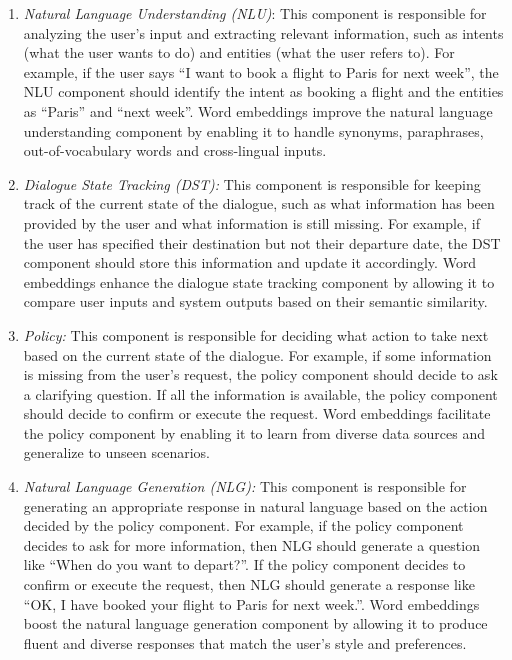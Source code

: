 \documentclass[11pt, a4paper]{amsart}
\begin{document}
\begin{enumerate}
	\item \emph{Natural Language Understanding (NLU)}:
	This component is responsible for analyzing the user’s input and extracting relevant information, such as intents (what the user wants to do) and entities (what the user refers to).
	For example, if the user says ``I want to book a flight to Paris for next week'', the NLU component should identify the intent as booking a flight and the entities as ``Paris'' and ``next week''.
	Word embeddings improve the natural language understanding component by enabling it to handle synonyms, paraphrases, out-of-vocabulary words and cross-lingual inputs.
	\item \emph{Dialogue State Tracking (DST):}
	This component is responsible for keeping track of the current state of the dialogue, such as what information has been provided by the user and what information is still missing.
	For example, if the user has specified their destination but not their departure date, the DST component should store this information and update it accordingly.
	Word embeddings enhance the dialogue state tracking component by allowing it to compare user inputs and system outputs based on their semantic similarity.
	\item \emph{Policy:}
	This component is responsible for deciding what action to take next based on the current state of the dialogue.
	For example, if some information is missing from the user’s request, the policy component should decide to ask a clarifying question.
	If all the information is available, the policy component should decide to confirm or execute the request.
	Word embeddings facilitate the policy component by enabling it to learn from diverse data sources and generalize to unseen scenarios.
	\item \emph{Natural Language Generation (NLG):}
	This component is responsible for generating an appropriate response in natural language based on the action decided by the policy component.
	For example, if the policy component decides to ask for more information, then NLG should generate a question like “When do you want to depart?”.
	If the policy component decides to confirm or execute the request, then NLG should generate a response like “OK, I have booked your flight to Paris for next week.”.
	Word embeddings boost the natural language generation component by allowing it to produce fluent and diverse responses that match the user’s style and preferences.
\end{enumerate}
\end{document}
